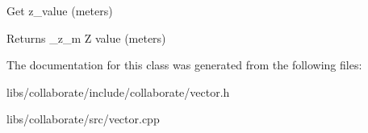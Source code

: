 Get z\+\_\+value (meters) 

\begin{DoxyReturn}{Returns}
\+\_\+z\+\_\+m Z value (meters) 
\end{DoxyReturn}


The documentation for this class was generated from the following files\+:\begin{DoxyCompactItemize}
\item 
libs/collaborate/include/collaborate/vector.\+h\item 
libs/collaborate/src/vector.\+cpp\end{DoxyCompactItemize}
